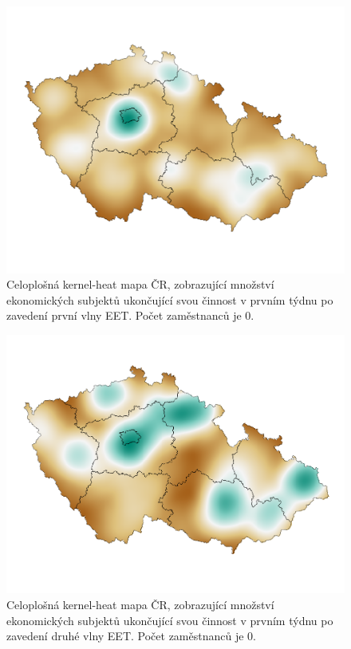 \documentclass[a4paper, 12pt]{article}
\begin{document}
\begin{figure}[ht]
	\centering
	\includegraphics[width=12cm]{1stwave.png}
	\caption{Celoplošná kernel-heat mapa ČR, zobrazující množství ekonomických subjektů ukončující svou činnost v prvním týdnu po zavedení první vlny EET. Počet zaměstnanců je 0.}
\end{figure}

\begin{figure}[ht]
	\centering
	\includegraphics[width=12cm]{2ndwave.png}
	\caption{Celoplošná kernel-heat mapa ČR, zobrazující množství ekonomických subjektů ukončující svou činnost v prvním týdnu po zavedení druhé vlny EET. Počet zaměstnanců je 0.}
\end{figure}

\clearpage
\end{document}
